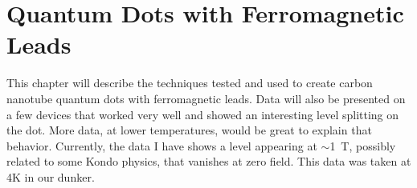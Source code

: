 \chapter{Quantum Dots with Ferromagnetic Leads}
\label{sec:FMCNTQD}


This chapter will describe the techniques tested and used to create carbon nanotube quantum dots with ferromagnetic leads. Data will also be presented on a few devices that worked very well and showed an interesting level splitting on the dot. More data, at lower temperatures, would be great to explain that behavior. Currently, the data I have shows a level appearing at $\sim$\SI{1}{\tesla}, possibly related to some Kondo physics, that vanishes at zero field. This data was taken at 4K in our dunker.
